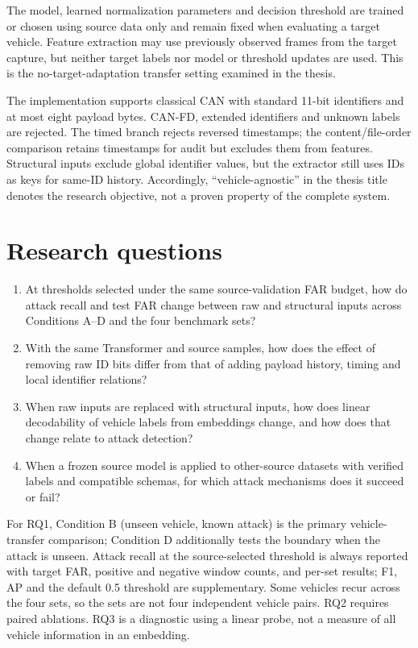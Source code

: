 \documentclass[12pt,a4paper,oneside,openany]{extbook}
\begin{document}
The model, learned normalization parameters and decision threshold are trained or chosen using source data only and remain fixed when evaluating a target vehicle. Feature extraction may use previously observed frames from the target capture, but neither target labels nor model or threshold updates are used. This is the no-target-adaptation transfer setting examined in the thesis.

The implementation supports classical CAN with standard 11-bit identifiers and at most eight payload bytes. CAN-FD, extended identifiers and unknown labels are rejected. The timed branch rejects reversed timestamps; the content/file-order comparison retains timestamps for audit but excludes them from features. Structural inputs exclude global identifier values, but the extractor still uses IDs as keys for same-ID history. Accordingly, ``vehicle-agnostic'' in the thesis title denotes the research objective, not a proven property of the complete system.

\section{Research questions}
\begin{enumerate}[label=\textbf{RQ\arabic*.}]
\item At thresholds selected under the same source-validation FAR budget, how do attack recall and test FAR change between raw and structural inputs across Conditions A--D and the four benchmark sets?
\item With the same Transformer and source samples, how does the effect of removing raw ID bits differ from that of adding payload history, timing and local identifier relations?
\item When raw inputs are replaced with structural inputs, how does linear decodability of vehicle labels from embeddings change, and how does that change relate to attack detection?
\item When a frozen source model is applied to other-source datasets with verified labels and compatible schemas, for which attack mechanisms does it succeed or fail?
\end{enumerate}
For RQ1, Condition B (unseen vehicle, known attack) is the primary vehicle-transfer comparison; Condition D additionally tests the boundary when the attack is unseen. Attack recall at the source-selected threshold is always reported with target FAR, positive and negative window counts, and per-set results; F1, AP and the default 0.5 threshold are supplementary. Some vehicles recur across the four sets, so the sets are not four independent vehicle pairs. RQ2 requires paired ablations. RQ3 is a diagnostic using a linear probe, not a measure of all vehicle information in an embedding.
\end{document}
